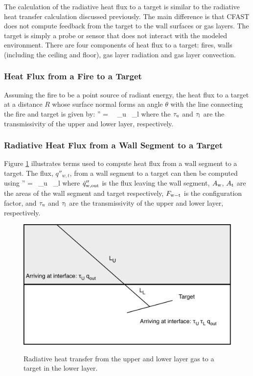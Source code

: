 The calculation of the radiative heat flux to a target is similar to the radiative heat transfer calculation discussed previously.  The main difference is that CFAST does not compute feedback from the target to the wall surfaces or gas layers.  The target is simply a probe or sensor that does not interact with the modeled environment. There are four components of heat flux to a target: fires, walls (including the ceiling and floor), gas layer radiation and gas layer convection.

\subsubsection{Heat Flux from a Fire to a Target} 

Assuming the fire to be a point source of radiant energy, the heat flux to a target at a distance $R$ whose surface normal forms an angle $\theta$ with the line connecting the fire and target is given by:
\be 
   \dqr'' =  \, \cos \brackets{\theta} \, \tau_{\rm u} \, \tau_{\rm l}
\ee
where the $\tau_{\rm u}$ and $\tau_{\rm l}$ are the transmissivity of the upper and lower layer, respectively.

\subsubsection{Radiative Heat Flux from a Wall Segment to a Target} 

Figure \ref{fig:Rad_Gases} illustrates terms used to compute heat flux from a wall segment to a target. The flux, $q\dprime_{w,t}$, from a wall segment to a target can then be computed using
\be 
   \dqr'' =  \, \tau_{\rm u} \, \tau_{\rm l} \label{eq:wall_target_flux} \ee
where $\dot{q}_{\rm w,out}''$  is the flux leaving the wall segment, $A_{\rm w}$, $A_{\rm t}$ are the areas of the wall segment and target respectively, $F_{\rm w-t}$  is the configuration factor, and $\tau_{\rm u}$ and $\tau_{\rm l}$ are the transmissivity of the upper and lower layer, respectively.
\begin{figure}
\begin{center}
\includegraphics[width=5.0in]{FIGURES/Theory/Radiation_Gases}\\
\end{center}
\caption{Radiative heat transfer from the upper and lower layer gas to a target in the lower layer.}
 \label{fig:Rad_Gases}
\end{figure}

